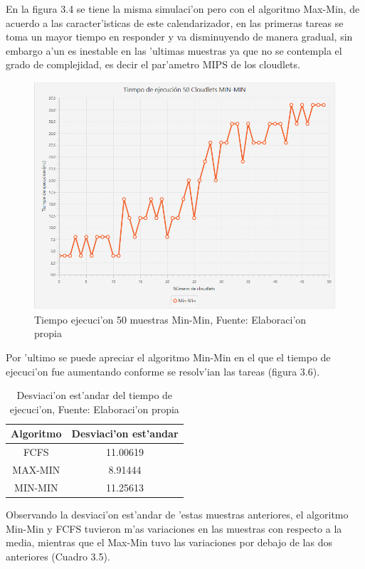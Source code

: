  En la figura 3.4 se tiene la misma simulaci'on pero con el algoritmo Max-Min, de acuerdo a las caracter'isticas de este calendarizador, en las primeras tareas se toma un mayor tiempo en responder y va disminuyendo de manera gradual, sin embargo a'un es inestable en las 'ultimas muestras ya que no se contempla el grado de complejidad, es decir el par'ametro MIPS de los cloudlets.

\begin{figure}[H] 
	\caption{Tiempo ejecuci'on 50 muestras Min-Min, Fuente: Elaboraci'on propia}
	\centering
	\includegraphics[scale=0.5]{media/min-min}
\end{figure}


Por 'ultimo se puede apreciar el algoritmo Min-Min en el que el tiempo de ejecuci'on fue aumentando conforme se resolv'ian las tareas (figura 3.6).

\begin{table}
	\centering
	\caption{Desviaci'on est'andar del tiempo de ejecuci'on, Fuente: Elaboraci'on propia}
	\label{my-label}
	\begin{tabular}{@{}cc@{}}
		\toprule
		{\bf Algoritmo} & \multicolumn{1}{l}{{\bf Desviaci'on est'andar}} \\ \midrule
		FCFS & 11.00619 \\
		MAX-MIN & 8.91444 \\
		MIN-MIN & 11.25613 \\ \bottomrule
	\end{tabular}
\end{table}

Observando la desviaci'on est'andar de 'estas muestras anteriores, el algoritmo Min-Min y FCFS tuvieron m'as variaciones en las muestras con respecto a la media, mientras que el Max-Min tuvo las variaciones por debajo de las dos anteriores (Cuadro 3.5).